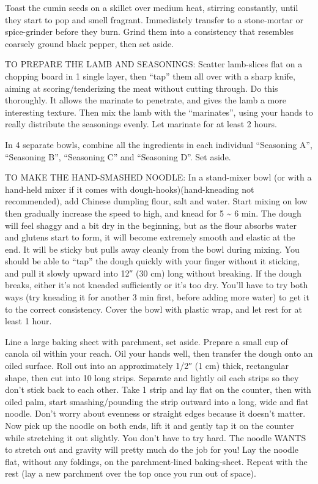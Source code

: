 \documentclass[
]{article}
\begin{document}
Toast the cumin seeds on a skillet over medium heat, stirring constantly, until they start to pop and smell fragrant. Immediately transfer to a stone-mortar or spice-grinder before they burn. Grind them into a consistency that resembles coarsely ground black pepper, then set aside.

TO PREPARE THE LAMB AND SEASONINGS: Scatter lamb-slices flat on a chopping board in 1 single layer, then ``tap'' them all over with a sharp knife, aiming at scoring/tenderizing the meat without cutting through. Do this thoroughly. It allows the marinate to penetrate, and gives the lamb a more interesting texture. Then mix the lamb with the ``marinates'', using your hands to really distribute the seasonings evenly. Let marinate for at least 2 hours.

In 4 separate bowls, combine all the ingredients in each individual ``Seasoning A'', ``Seasoning B'', ``Seasoning C'' and ``Seasoning D''. Set aside.

TO MAKE THE HAND-SMASHED NOODLE: In a stand-mixer bowl (or with a hand-held mixer if it comes with dough-hooks)(hand-kneading not recommended), add Chinese dumpling flour, salt and water. Start mixing on low then gradually increase the speed to high, and knead for 5 \textasciitilde{} 6 min. The dough will feel shaggy and a bit dry in the beginning, but as the flour absorbs water and glutens start to form, it will become extremely smooth and elastic at the end. It will be sticky but pulls away cleanly from the bowl during mixing. You should be able to ``tap'' the dough quickly with your finger without it sticking, and pull it slowly upward into 12″ (30 cm) long without breaking. If the dough breaks, either it's not kneaded sufficiently or it's too dry. You'll have to try both ways (try kneading it for another 3 min first, before adding more water) to get it to the correct consistency. Cover the bowl with plastic wrap, and let rest for at least 1 hour.

Line a large baking sheet with parchment, set aside. Prepare a small cup of canola oil within your reach. Oil your hands well, then transfer the dough onto an oiled surface. Roll out into an approximately 1/2″ (1 cm) thick, rectangular shape, then cut into 10 long strips. Separate and lightly oil each strips so they don't stick back to each other. Take 1 strip and lay flat on the counter, then with oiled palm, start smashing/pounding the strip outward into a long, wide and flat noodle. Don't worry about evenness or straight edges because it doesn't matter. Now pick up the noodle on both ends, lift it and gently tap it on the counter while stretching it out slightly. You don't have to try hard. The noodle WANTS to stretch out and gravity will pretty much do the job for you! Lay the noodle flat, without any foldings, on the parchment-lined baking-sheet. Repeat with the rest (lay a new parchment over the top once you run out of space).
\end{document}
